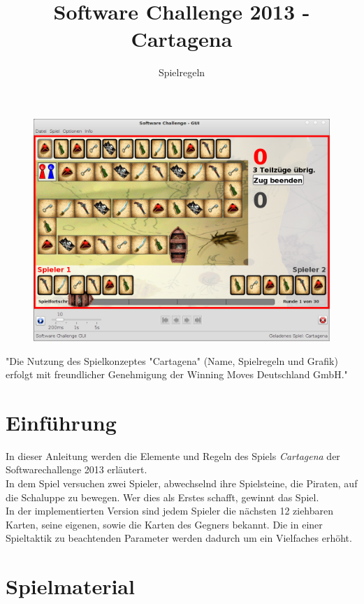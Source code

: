\documentclass[a4paper, ngerman]{scrartcl}
\title{Software Challenge 2013 - Cartagena}
\subtitle{Spielregeln}
\begin{document}
\maketitle

\begin{figure}[h]
	\centering
	\includegraphics[width=\linewidth]{bilder/Uebersicht.png}
\end{figure}
\vspace*{\fill}
"Die Nutzung des Spielkonzeptes "Cartagena" (Name, Spielregeln und Grafik)
erfolgt mit freundlicher Genehmigung der Winning Moves Deutschland GmbH."
\newpage
\tableofcontents
\newpage

\section{Einführung}
In dieser Anleitung werden die Elemente und Regeln des Spiels \emph{Cartagena}
der Soft\-ware\-challenge 2013 erläutert.\\
In dem Spiel versuchen zwei Spieler,
abwechselnd ihre Spielsteine, die Piraten, auf die Schaluppe zu bewegen. Wer
dies als Erstes schafft, gewinnt das Spiel.\\
In der implementierten Version sind jedem Spieler die nächsten 12 ziehbaren
Karten, seine eigenen, sowie die Karten des Gegners bekannt. Die
in einer Spieltaktik zu beachtenden Parameter werden dadurch um ein Vielfaches
erhöht.

\section{Spielmaterial}
\end{document}

